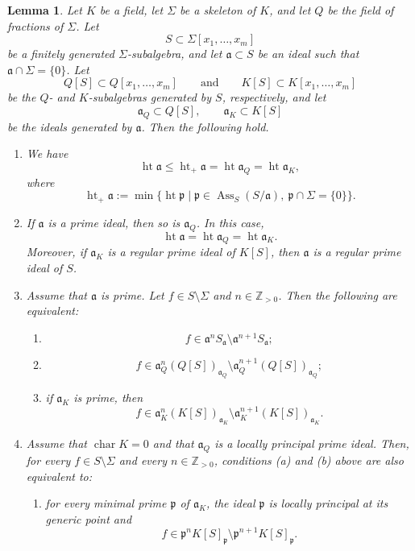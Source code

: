 \documentclass[a4paper]{amsart}
\newtheorem{lem}[thm]{Lemma}
\theoremstyle{definition}
\begin{document}
\begin{lem}\label{ext-of-field}
Let $K$ be a field, let $\Sigma$ be a skeleton of $K$, and let
$Q$ be the field of fractions of $\Sigma$.
Let
\[
S \subset \Sigma[x_1,\ldots,x_m]
\]
be a finitely generated $\Sigma$-subalgebra, and let $\mathfrak a \subset S$ be an
ideal such that $\mathfrak a \cap \Sigma = \{0\}$.
Let
\[
Q[S]\subset Q[x_1,\ldots,x_m]
\qquad\text{and}\qquad
K[S]\subset K[x_1,\ldots,x_m]
\]
be the $Q$- and $K$-subalgebras generated by $S$, respectively, and let
\[
\mathfrak a_Q \subset Q[S],
\qquad
\mathfrak a_K \subset K[S]
\]
be the ideals generated by $\mathfrak a$.
Then the following hold.

\begin{enumerate}
\item[(i)]
We have
\[
\operatorname{ht}\mathfrak a
\le
\operatorname{ht}_+\mathfrak a
=
\operatorname{ht}\mathfrak a_Q
=
\operatorname{ht}\mathfrak a_K,
\]
where
\[
\operatorname{ht}_+\mathfrak a
:=
\min\bigl\{
\operatorname{ht}\mathfrak p
\;\big|\;
\mathfrak p\in \operatorname{Ass}_S(S/\mathfrak a),
\ \mathfrak p\cap \Sigma=\{0\}
\bigr\}.
\]

\item[(ii)]
If $\mathfrak a$ is a prime ideal, then so is $\mathfrak a_Q$.
In this case,
\[
\operatorname{ht}\mathfrak a
=
\operatorname{ht}\mathfrak a_Q
=
\operatorname{ht}\mathfrak a_K.
\]
Moreover, if $\mathfrak a_K$ is a regular prime ideal of $K[S]$, then
$\mathfrak a$ is a regular prime ideal of $S$.

\item[(iii)]
Assume that $\mathfrak a$ is prime.
Let $f\in S\setminus \Sigma$ and $n\in \mathbb Z_{>0}$.
Then the following are equivalent:
\begin{enumerate}
\item[(a)]
\[
f\in \mathfrak a^n S_{\mathfrak a}\setminus \mathfrak a^{n+1}S_{\mathfrak a};
\]
\item[(b)]
\[
f\in \mathfrak a_Q^n (Q[S])_{\mathfrak a_Q}
\setminus
\mathfrak a_Q^{n+1}(Q[S])_{\mathfrak a_Q};
\]
\item[(c)]
if $\mathfrak a_K$ is prime, then
\[
f\in \mathfrak a_K^n (K[S])_{\mathfrak a_K}
\setminus
\mathfrak a_K^{n+1}(K[S])_{\mathfrak a_K}.
\]
\end{enumerate}

\item[(iv)]
Assume that $\operatorname{char}K=0$ and that $\mathfrak a_Q$ is a locally
principal prime ideal.
Then, for every $f\in S\setminus \Sigma$ and every $n\in \mathbb Z_{>0}$,
conditions {\rm (a)} and {\rm (b)} above are also equivalent to:
\begin{enumerate}
\item[(d)]
for every minimal prime $\mathfrak p$ of $\mathfrak a_K$, the ideal $\mathfrak p$
is locally principal at its generic point and
\[
f\in \mathfrak p^n K[S]_{\mathfrak p}
\setminus
\mathfrak p^{n+1} K[S]_{\mathfrak p}.
\]
\end{enumerate}
\end{enumerate}
\end{lem}
\end{document}
